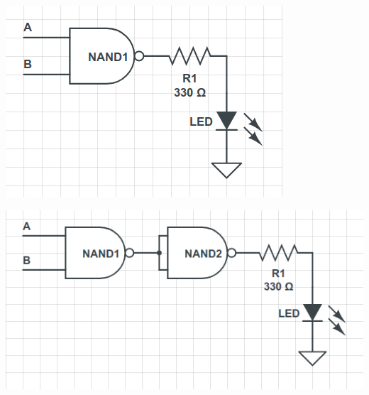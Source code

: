 \documentclass{article}
\begin{document}
	\begin{minipage}{.45\linewidth}
		\centering
		\includegraphics[width=\linewidth]{figure/NAND}
		\label{fig:NAND}
	\end{minipage}
	\begin{minipage}{.6\linewidth}
		\includegraphics[width=\linewidth]{figure/AND}
		\label{fig:AND}
	\end{minipage}\newline
	
\end{document}
